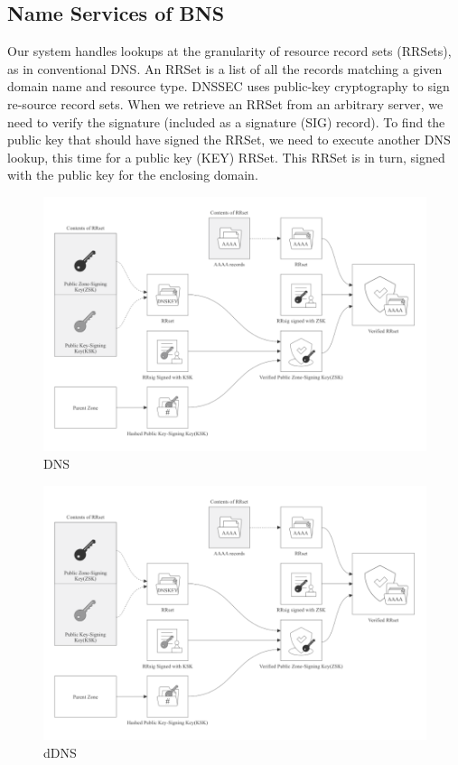 \documentclass[twocolumn]{article}
\begin{document}
\subsection{Name Services of BNS}
Our system handles lookups at the granularity of resource record sets (RRSets), as in conventional DNS. An RRSet is a list of all the records matching a given domain name and resource type.
DNSSEC uses public-key cryptography to sign re-source record sets. When we retrieve an RRSet from an arbitrary server, we need to verify the signature (included as a signature (SIG) record). To find the public key that should have signed the RRSet, we need to execute another DNS lookup, this time for a public key (KEY) RRSet. This RRSet is in turn, signed with the public key for the enclosing domain.
\begin{figure}[H]
  \includegraphics[width=\linewidth]{imgs/2.png}
    \caption{DNS}
\end{figure}
\begin{figure}[htbp]
  \includegraphics[width=\linewidth]{imgs/4.png}
  \caption{dDNS}
  \label{ddns}

  \end{figure}
\end{document}
